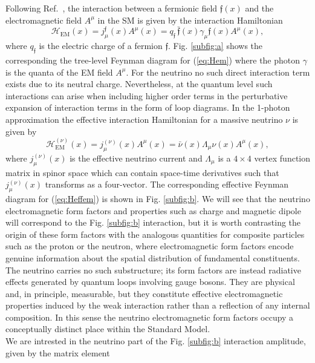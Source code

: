 Following Ref.~\cite{RevModPhys.87.531}, the interaction between a fermionic field $\mathfrak{f}(x)$ and the electromagnetic field $A^\mu$ in the SM is given by the interaction Hamiltonian
\begin{equation}\label{eq:Hem}
	\mathcal{H}_{\text{EM}}(x) = j^{\mathfrak{f}}_{\mu}(x)A^\mu(x) = q_{\mathfrak{f}}\,\bar{\mathfrak{f}}(x)\gamma_\mu\mathfrak{f}(x)A^\mu(x),
\end{equation}
where $q_\mathfrak{f}$ is the electric charge of a fermion $\mathfrak{f}$. Fig. \ref{subfig:a} shows the corresponding the tree-level Feynman diagram for (\ref{eq:Hem}) where the photon $\gamma$ is the quanta of the EM field $A^\mu$. For the neutrino no such direct interaction term exists due to its neutral charge. Nevertheless, at the quantum level such interactions can arise when including higher order terms in the perturbative expansion of interaction terms in the form of loop diagrams. In the 1-photon approximation the effective interaction Hamiltonian for a massive neutrino $\nu$ is given by
\begin{equation}\label{eq:Heffem}
	\mathcal{H}^{(\nu)}_{\text{EM}}(x) = j^{(\nu)}_{\mu}(x)A^\mu(x) = \bar{\nu}(x)\Lambda_\mu\nu(x)A^\mu(x),
\end{equation}
where $j^{(\nu)}_{\mu}(x)$ is the effective neutrino current and $\Lambda_\mu$ is a $4\times4$ vertex function matrix in spinor space which can contain space-time derivatives such that $j^{(\nu)}_{\mu}(x)$ transforms as a four-vector. The corresponding effective Feynman diagram for (\ref{eq:Heffem}) is shown in Fig. \ref{subfig:b}. We will see that the neutrino electromagnetic form factors and properties such as charge and magnetic dipole will correspond to the Fig. \ref{subfig:b} interaction, but it is worth contrasting the origin of these form factors with the analogous quantities for composite particles such as the proton or the neutron, where electromagnetic form factors encode genuine information about the spatial distribution of fundamental constituents. The neutrino carries no such substructure; its form factors are instead radiative effects generated by quantum loops involving gauge bosons. They are physical and, in principle, measurable, but they constitute effective electromagnetic properties induced by the weak interaction rather than a reflection of any internal composition. In this sense the neutrino electromagnetic form factors occupy a conceptually distinct place within the Standard Model. \\
We are intrested in the neutrino part of the Fig. \ref{subfig:b} interaction amplitude, given by the matrix element
